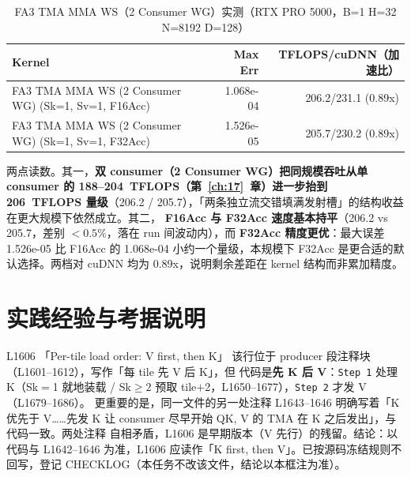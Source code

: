 \begin{table}[H]
\centering
\caption{FA3 TMA MMA WS（2 Consumer WG）实测（RTX PRO 5000，B=1 H=32 N=8192 D=128）}
\label{tab:ch18-perf}
\footnotesize
\setlength{\tabcolsep}{4pt}
\begin{tabular}{lrr}
\toprule
Kernel & Max Err & TFLOPS/cuDNN（加速比） \\
\midrule
FA3 TMA MMA WS (2 Consumer WG) (Sk=1, Sv=1, F16Acc) & 1.068e-04 & 206.2/231.1 (0.89x) \\
FA3 TMA MMA WS (2 Consumer WG) (Sk=1, Sv=1, F32Acc) & 1.526e-05 & 205.7/230.2 (0.89x) \\
\bottomrule
\end{tabular}
\end{table}

两点读数。其一，\textbf{双 consumer（2 Consumer WG）把同规模吞吐从单 consumer
的 188--204~TFLOPS（第~\ref{ch:17}~章）进一步抬到 206~TFLOPS 量级}（206.2 /
205.7），「两条独立流交错填满发射槽」的结构收益在更大规模下依然成立。其二，
\textbf{F16Acc 与 F32Acc 速度基本持平}（206.2 vs 205.7，差别 $<0.5\%$，落在
run 间波动内），而 \textbf{F32Acc 精度更优}：最大误差 1.526e-05 比 F16Acc 的
1.068e-04 小约一个量级，本规模下 F32Acc 是更合适的默认选择。两档对 cuDNN 均为
0.89x，说明剩余差距在 kernel 结构而非累加精度。

\section{实践经验与考据说明}

\begin{kaogu}[F1·注释与代码相反]{L1606 「Per-tile load order: V first, then K」}
  该行位于 producer 段注释块（L1601--1612），写作「每 tile 先 V 后 K」，但
  代码是\textbf{先 K 后 V}：\texttt{Step 1} 处理 K（Sk$=$1 就地装载 /
  Sk$\ge2$ 预取 tile$+$2，L1650--1677），\texttt{Step 2} 才发 V（L1679--1686）。
  更重要的是，同一文件的另一处注释 L1643--1646 明确写着「K 优先于 V……先发 K
  让 consumer 尽早开始 QK, V 的 TMA 在 K 之后发出」，与代码一致。两处注释
  自相矛盾，L1606 是早期版本（V 先行）的残留。结论：以代码与 L1642--1646
  为准，L1606 应读作「K first, then V」。已按源码冻结规则不回写，登记
  CHECKLOG（本任务不改该文件，结论以本框注为准）。
\end{kaogu}


